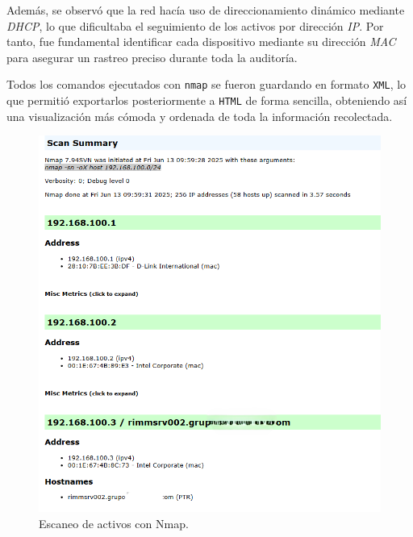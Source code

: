 \documentclass[a4paper, 11pt]{article}
\begin{document}
Además, se observó que la red hacía uso de direccionamiento dinámico mediante \textit{DHCP}, lo que dificultaba el seguimiento de los activos por dirección \textit{IP}. Por tanto, fue fundamental identificar cada dispositivo mediante su dirección \textit{MAC} para asegurar un rastreo preciso durante toda la auditoría.

Todos los comandos ejecutados con \texttt{nmap} se fueron guardando en formato \texttt{XML}, lo que permitió exportarlos posteriormente a \texttt{HTML} de forma sencilla, obteniendo así una visualización más cómoda y ordenada de toda la información recolectada.

\begin{figure}[H]
    \centering
    \includegraphics[width=1\textwidth]{images/scan_hosts_nmap.png}
    \caption{Escaneo de activos con Nmap.}
    \label{fig:nmap_hosts}
\end{figure}
\end{document}
